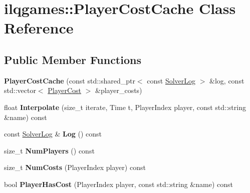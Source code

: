 \hypertarget{classilqgames_1_1_player_cost_cache}{}\section{ilqgames\+:\+:Player\+Cost\+Cache Class Reference}
\label{classilqgames_1_1_player_cost_cache}
\subsection*{Public Member Functions}
\begin{DoxyCompactItemize}
\item 
{\bfseries Player\+Cost\+Cache} (const std\+::shared\+\_\+ptr$<$ const \hyperlink{classilqgames_1_1_solver_log}{Solver\+Log} $>$ \&log, const std\+::vector$<$ \hyperlink{classilqgames_1_1_player_cost}{Player\+Cost} $>$ \&player\+\_\+costs)\hypertarget{classilqgames_1_1_player_cost_cache_adbd5ce8295698ea99050b13dbc6055e5}{}\label{classilqgames_1_1_player_cost_cache_adbd5ce8295698ea99050b13dbc6055e5}

\item 
float {\bfseries Interpolate} (size\+\_\+t iterate, Time t, Player\+Index player, const std\+::string \&name) const \hypertarget{classilqgames_1_1_player_cost_cache_a9eb65722d7e25bb7f6363219122c4333}{}\label{classilqgames_1_1_player_cost_cache_a9eb65722d7e25bb7f6363219122c4333}

\item 
const \hyperlink{classilqgames_1_1_solver_log}{Solver\+Log} \& {\bfseries Log} () const \hypertarget{classilqgames_1_1_player_cost_cache_a3817f43d253d3121696c147dd37ae20f}{}\label{classilqgames_1_1_player_cost_cache_a3817f43d253d3121696c147dd37ae20f}

\item 
size\+\_\+t {\bfseries Num\+Players} () const \hypertarget{classilqgames_1_1_player_cost_cache_ad210288d53af5528c322ab60bbb4cb82}{}\label{classilqgames_1_1_player_cost_cache_ad210288d53af5528c322ab60bbb4cb82}

\item 
size\+\_\+t {\bfseries Num\+Costs} (Player\+Index player) const \hypertarget{classilqgames_1_1_player_cost_cache_af8d8c5a7804f28f7d0265f7e0f432762}{}\label{classilqgames_1_1_player_cost_cache_af8d8c5a7804f28f7d0265f7e0f432762}

\item 
bool {\bfseries Player\+Has\+Cost} (Player\+Index player, const std\+::string \&name) const \hypertarget{classilqgames_1_1_player_cost_cache_a01b366ade3f588b5d5bc743a45f9e603}{}\label{classilqgames_1_1_player_cost_cache_a01b366ade3f588b5d5bc743a45f9e603}


\end{DoxyCompactItemize}
